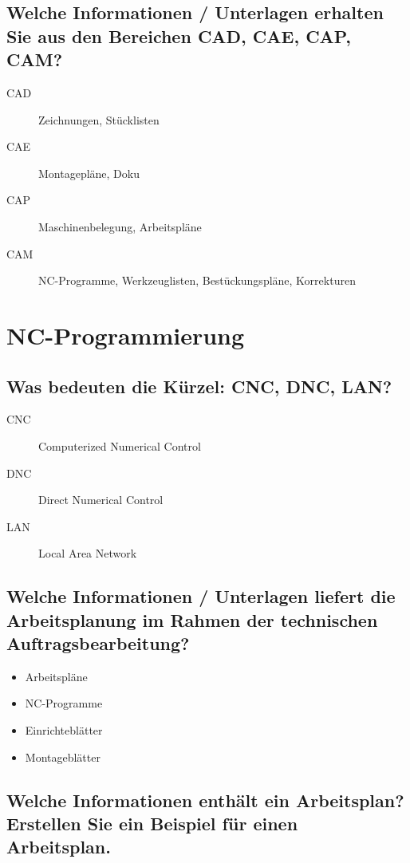 \subsection*{%
    Welche Informationen / Unterlagen erhalten Sie aus den Bereichen CAD, CAE,
    CAP, CAM?
}

\begin{description}
    \item[CAD] Zeichnungen, Stücklisten
    \item[CAE] Montagepläne, Doku
    \item[CAP] Maschinenbelegung, Arbeitspläne
    \item[CAM] NC-Programme, Werkzeuglisten, Bestückungspläne, Korrekturen
\end{description}

\newpage

\section{NC-Programmierung}

\subsection*{Was bedeuten die Kürzel: CNC, DNC, LAN?}

\begin{description}
    \item[CNC] Computerized Numerical Control
    \item[DNC] Direct Numerical Control
    \item[LAN] Local Area Network
\end{description}

\subsection*{%
    Welche Informationen / Unterlagen liefert die Arbeitsplanung im Rahmen der
    technischen Auftragsbearbeitung?
}

\begin{itemize}
    \item Arbeitspläne
    \item NC-Programme
    \item Einrichteblätter
    \item Montageblätter
\end{itemize}

\subsection*{
    Welche Informationen enthält ein Arbeitsplan? Erstellen Sie ein Beispiel
    für einen Arbeitsplan.
}

